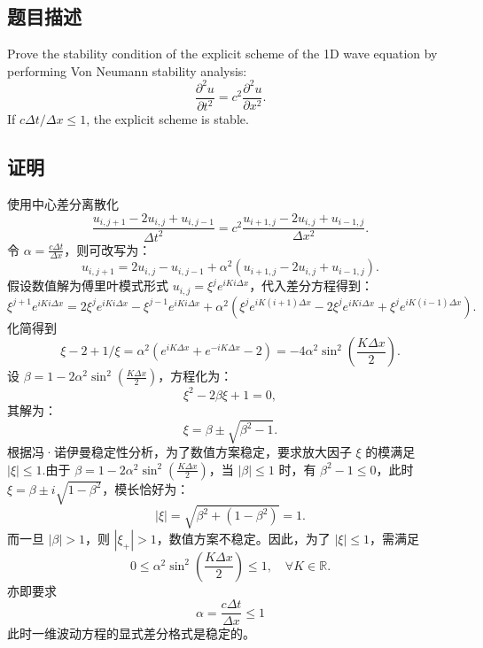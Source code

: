 \subsection{题目描述}
\noindent
Prove the stability condition of the explicit scheme of the 1D wave equation by performing Von Neumann stability analysis:
\[
    \frac{\partial^2 u}{\partial t^2} = c^2 \frac{\partial^2 u}{\partial x^2}.
\]
If \(c \Delta t / \Delta x \leq 1\), the explicit scheme is stable.

\subsection{证明}
使用中心差分离散化
\[
    \frac{u_{i,j+1} - 2u_{i,j} + u_{i,j-1}}{\Delta t^2} = c^2 \frac{u_{i+1,j} - 2u_{i,j} + u_{i-1,j}}{\Delta x^2}.
\]
令 \( \alpha = \frac{c \Delta t}{\Delta x} \)，则可改写为：
\[
    u_{i,j+1} = 2u_{i,j} - u_{i,j-1} + \alpha^2 (u_{i+1,j} - 2u_{i,j} + u_{i-1,j}).
\]
假设数值解为傅里叶模式形式 \( u_{i,j} = \xi^j e^{iK i \Delta x} \)，代入差分方程得到：
\[
    \xi^{j+1} e^{iK i \Delta x} = 2\xi^j e^{iK i \Delta x} - \xi^{j-1} e^{iK i \Delta x} + \alpha^2 \left( \xi^j e^{iK (i+1) \Delta x} - 2\xi^j e^{iK i \Delta x} + \xi^j e^{iK (i-1) \Delta x} \right).
\]
化简得到
\[
    \xi - 2 + 1/\xi = \alpha^2 (e^{iK \Delta x} + e^{-iK \Delta x} - 2) = -4\alpha^2 \sin^2\left(\frac{K \Delta x}{2}\right).
\]
设 \( \beta = 1 - 2\alpha^2 \sin^2\left(\frac{K \Delta x}{2}\right) \)，方程化为：
\[
    \xi^2 - 2\beta \xi + 1 = 0,
\]
其解为：
\[
    \xi = \beta \pm \sqrt{\beta^2 - 1}.
\]
根据冯·诺伊曼稳定性分析，为了数值方案稳定，要求放大因子 \( \xi \) 的模满足 \( |\xi| \leq 1 \).由于 \( \beta = 1 - 2\alpha^2 \sin^2\left(\frac{K \Delta x}{2}\right) \)，当 \( |\beta| \leq 1 \) 时，有 \( \beta^2 - 1 \leq 0 \)，此时 \( \xi = \beta \pm i\sqrt{1 - \beta^2} \)，模长恰好为：
\[
    |\xi| = \sqrt{\beta^2 + (1 - \beta^2)} = 1.
\]
而一旦 \( |\beta| > 1 \)，则 \( |\xi_{+}| > 1 \)，数值方案不稳定。因此，为了 \( |\xi| \leq 1 \)，需满足
\[
    0\leq\alpha^2\sin^2(\frac{K\Delta x}2)\leq1, \quad \forall K \in \mathbb{R}.
\]
亦即要求
\[
    \boxed{\alpha = \frac{c \Delta t}{\Delta x} \leq 1}
\]
此时一维波动方程的显式差分格式是稳定的。